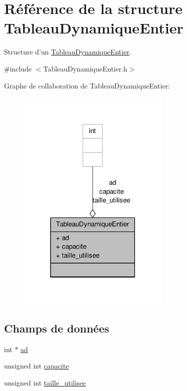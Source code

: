 \hypertarget{structTableauDynamiqueEntier}{\section{Référence de la structure Tableau\-Dynamique\-Entier}
\label{structTableauDynamiqueEntier}
}


Structure d'un \hyperlink{structTableauDynamiqueEntier}{Tableau\-Dynamique\-Entier}.  




{\ttfamily \#include $<$Tableau\-Dynamique\-Entier.\-h$>$}



Graphe de collaboration de Tableau\-Dynamique\-Entier\-:\nopagebreak
\begin{figure}[H]
\begin{center}
\leavevmode
\includegraphics[width=206pt]{structTableauDynamiqueEntier__coll__graph}
\end{center}
\end{figure}
\subsection*{Champs de données}
\begin{DoxyCompactItemize}
\item 
int $\ast$ \hyperlink{structTableauDynamiqueEntier_a2ebf85c435f6e7db67050c4fbcaf62a9}{ad}
\item 
unsigned int \hyperlink{structTableauDynamiqueEntier_a1fbdd8e4a11ba95e5a802fe9bb6cc2ff}{capacite}
\item 
unsigned int \hyperlink{structTableauDynamiqueEntier_ac7a23b3a002b4ce72556a1d5cebd3025}{taille\-\_\-utilisee}
\end{DoxyCompactItemize}


